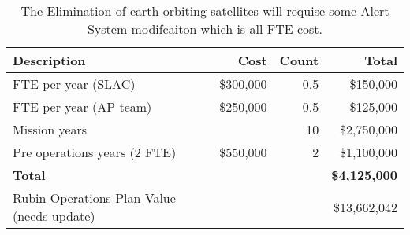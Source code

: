 \tiny \begin{longtable} {|l|r|r|r|} \caption{The Elimination of earth orbiting satellites will requise some Alert System modifcaiton which is all FTE cost. \label{tab:eliminate}}\\ 
\hline 
\textbf{Description}&\textbf{Cost}&\textbf{Count}&\textbf{Total} \\ \hline
{FTE per year (SLAC)}&{\$300,000}&{0.5}&{\$150,000} \\ \hline
{FTE per year (AP team)}&{\$250,000}&{0.5}&{\$125,000} \\ \hline
{Mission years}&{}&{10}&{\$2,750,000} \\ \hline
{Pre operations years (2 FTE)}&{\$550,000}&{2}&{\$1,100,000} \\ \hline
\textbf{Total }&\textbf{}&\textbf{}&\textbf{\$4,125,000} \\ \hline
{Rubin Operations Plan Value (needs update)}&{}&{}&{\$13,662,042} \\ \hline
\end{longtable} \normalsize
